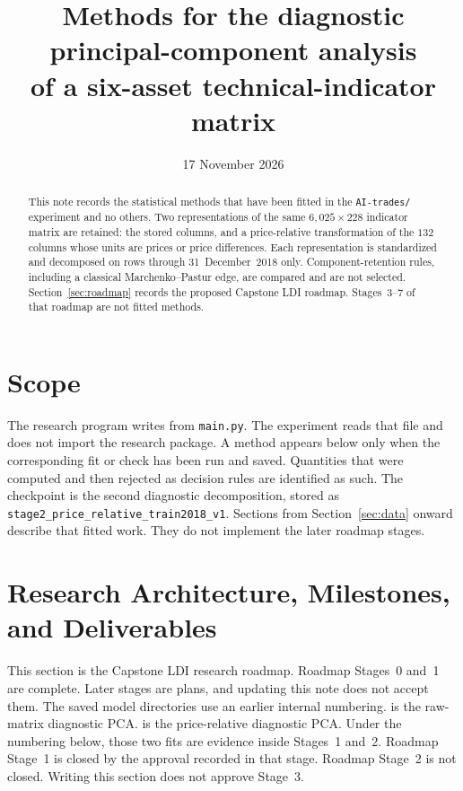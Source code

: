 \documentclass[11pt]{article}
\title{Methods for the diagnostic principal-component analysis\\ of a six-asset technical-indicator matrix}
\author{}
\date{17 November 2026}
\begin{document}
\maketitle

\begin{abstract}
This note records the statistical methods that have been fitted in the \texttt{AI-trades/} experiment and no others.
Two representations of the same \(6{,}025\times 228\) indicator matrix are retained: the stored columns, and a price-relative transformation of the \(132\) columns whose units are prices or price differences.
Each representation is standardized and decomposed on rows through 31~December~2018 only.
Component-retention rules, including a classical Marchenko--Pastur edge, are compared and are not selected.
Section~\ref{sec:roadmap} records the proposed Capstone LDI roadmap.
Stages~3--7 of that roadmap are not fitted methods.
\end{abstract}

\section{Scope}

The research program writes  from \texttt{main.py}.
The experiment reads that file and does not import the research package.
A method appears below only when the corresponding fit or check has been run and saved.
Quantities that were computed and then rejected as decision rules are identified as such.
The checkpoint is the second diagnostic decomposition, stored as \texttt{stage2\_price\_relative\_train2018\_v1}.
Sections from Section~\ref{sec:data} onward describe that fitted work.
They do not implement the later roadmap stages.

\section{Research Architecture, Milestones, and Deliverables}
\label{sec:roadmap}

This section is the Capstone LDI research roadmap.
Roadmap Stages~0 and~1 are complete.
Later stages are plans, and updating this note does not accept them.
The saved model directories use an earlier internal numbering.
 is the raw-matrix diagnostic PCA.
 is the price-relative diagnostic PCA.
Under the numbering below, those two fits are evidence inside Stages~1 and~2.
Roadmap Stage~1 is closed by the approval recorded in that stage.
Roadmap Stage~2 is not closed.
Writing this section does not approve Stage~3.
\end{document}
